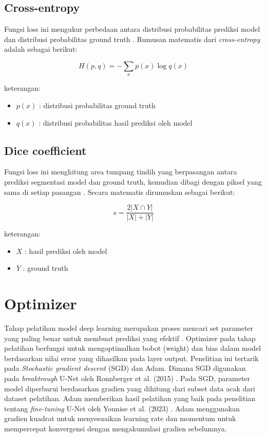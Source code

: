 \subsection{Cross-entropy} Fungsi loss ini mengukur perbedaan antara distribusi probabilitas prediksi model dan distribusi probabilitas ground truth \cite{herrera_impact_2022}. Rumusan matematis dari \textit{cross-entropy} adalah sebagai berikut:

\begin{equation} 
	H(p, q) = - \sum_{x} p(x) \log q(x) 
\end{equation} 

\noindent
keterangan:
\begin{itemize}
	\item $p(x)$ : distribusi probabilitas ground truth
	\item $q(x)$ : distribusi probabilitas hasil prediksi oleh model
\end{itemize}

\subsection{Dice coefficient} Fungsi loss ini menghitung area tumpang tindih yang berpasangan antara prediksi segmentasi model dan ground truth, kemudian dibagi dengan piksel yang sama di setiap pasangan \cite{herrera_impact_2022}. Secara matematis dirumuskan sebagai berikut:

\begin{equation}
	s = \frac{2|X \cap Y|}{|X| + |Y|}
\end{equation}
	
\noindent
keterangan:
\begin{itemize}
	\item $X$ : hasil prediksi oleh model
	\item $Y$ : ground truth
\end{itemize}


\section{Optimizer}
\noindent Tahap pelatihan model deep learning merupakan proses mencari set parameter yang paling benar untuk membuat prediksi yang efektif \cite{dawani_hands-mathematics_2020, bishop_deep_2024}. Optimizer pada tahap pelatihan berfungsi untuk mengoptimalkan bobot (weight) dan bias dalam model berdasarkan nilai error yang dihasilkan pada layer output.  Penelitian ini tertarik pada \textit{Stochastic gradient descent} (SGD) dan Adam. Dimana SGD digunakan pada \textit{breaktrough} U-Net oleh Ronnberger et al. (2015) \cite{ronneberger_u-net_2015}. Pada SGD, parameter model diperbarui berdasarkan gradien yang dihitung dari subset data acak dari dataset pelatihan. Adam memberikan hasil pelatihan yang baik pada penelitian tentang \textit{fine-tuning} U-Net oleh Younise et al. (2023) \cite{younisse_fine-tuning_2023}. Adam menggunakan gradien kuadrat untuk menyesuaikan learning rate dan momentum untuk mempercepat konvergensi dengan mengakumulasi gradien sebelumnya.

